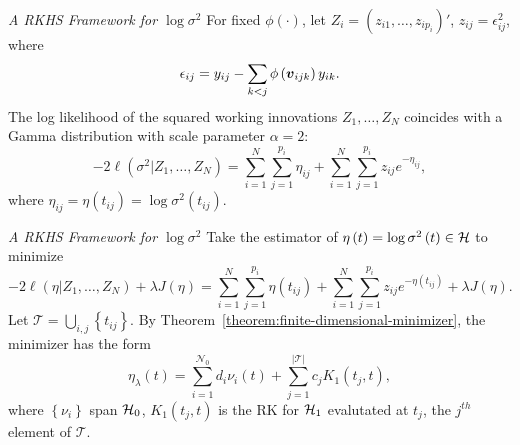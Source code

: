 \begin{frame}{\textit{A RKHS Framework for $\log \sigma^2$}}
For fixed $\phi\left(\cdot\right)$, let $Z_i = \left(z_{i1}, \dots , z_{ip_i}\right)'$, $z_{ij} = \epsilon_{ij}^2$, where
\[
\epsilon_{ij} =  y_{ij} - \sum_{k<j} \phi\left(\mbox{\boldmath $v$}_{ijk}\right) y_{ik}.
\]
The log likelihood of the squared working innovations $Z_1,\dots, Z_N$ coincides with a Gamma distribution with scale parameter $\alpha = 2$:
\begin{equation*} %
-2\ell\left(  \sigma^2 \vert Z_1,\dots, Z_N \right) =  \sum_{i = 1}^N \sum_{j = 1}^{p_i} \eta_{ij}  + \sum_{i = 1}^N \sum_{j = 1}^{p_i} z_{ij}e^{-\eta_{ij}},
\end{equation*}
\noindent
where $\eta_{ij} = \eta\left(t_{ij}\right) = \log \sigma^2\left(t_{ij}\right)$.
\end{frame}


\begin{frame}{\textit{A RKHS Framework for $\log \sigma^2$}}
\footnotesize
Take the estimator of $\eta\left(t\right) = \log\sigma^2\left(t\right) \in \mathcal{H}$ to minimize
\begin{equation*} %
-2\ell\left( \eta \vert Z_1,\dots, Z_N \right) +\lambda J \left(\eta\right) =  \sum_{i = 1}^N \sum_{j = 1}^{p_i} \eta\left(t_{ij}\right)  + \sum_{i = 1}^N \sum_{j = 1}^{p_i} z_{ij} e^{-\eta\left(t_{ij}\right)} + \lambda J\left(\eta\right).  
\end{equation*}
\noindent
Let $\mathcal{T} = \bigcup_{i,j} \left\{t_{ij}\right\}$. By Theorem~\ref{theorem:finite-dimensional-minimizer}, the minimizer has the form 
\begin{equation*}%
\eta_\lambda\left( t \right) = \sum_{i = 1}^{\mathcal{N}_0} d_i \nu_i\left( t \right) + \sum_{j = 1}^{\vert \mathcal{T} \vert} c_j K_1\left(t_j,t\right),
\end{equation*}  
\noindent
where $\left\{\nu_i \right\}$ span $\mathcal{H}_0$, $K_1\left(t_j,t\right)$ is the RK for $\mathcal{H}_1$ evalutated at ${t_j}$, the $j^{th}$ element of $\mathcal{T}$.

\end{frame}




